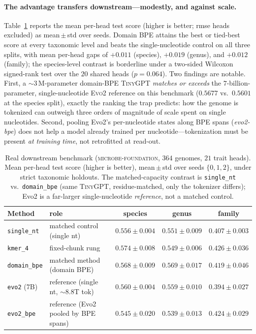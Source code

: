 \paragraph{The advantage transfers downstream---modestly, and against scale.}
Table~\ref{tab:microbe} reports the mean per-head test score (higher is
better; rmse heads excluded) as mean\,$\pm$\,std over seeds. Domain BPE attains
the best or tied-best score at every taxonomic level and beats the
single-nucleotide control on all three splits, with mean per-head gaps of
$+0.011$ (species), $+0.019$ (genus), and $+0.012$ (family); the species-level
contrast is borderline under a two-sided Wilcoxon signed-rank test over the
$20$ shared heads ($p = 0.064$). Two findings are notable. First, a
$\sim\!3$\,M-parameter domain-BPE \textsc{TinyGPT} \emph{matches or exceeds}
the $7$-billion-parameter, single-nucleotide \textsc{Evo2} reference on this
benchmark ($0.5677$ vs.\ $0.5601$ at the species split), exactly the ranking
the trap predicts: how the genome is tokenized can outweigh three orders of
magnitude of scale spent on single nucleotides. Second, pooling Evo2's
per-nucleotide states along BPE spans (\emph{evo2-bpe}) does not help a model
already trained per nucleotide---tokenization must be present \emph{at training
time}, not retrofitted at read-out.

\begin{table}[t]
\centering
\caption{Real downstream benchmark (\textsc{microbe-foundation}, $364$
genomes, $21$ trait heads). Mean per-head test score (higher is better),
mean\,$\pm$\,std over seeds $\{0,1,2\}$, under strict taxonomic holdouts. The
matched-capacity contrast is \texttt{single\_nt} vs.\ \texttt{domain\_bpe}
(same \textsc{TinyGPT}, residue-matched, only the tokenizer differs); Evo2 is a
far-larger single-nucleotide \emph{reference}, not a matched control.}
\label{tab:microbe}
\small
\setlength{\tabcolsep}{5pt}
\begin{tabular}{llccc}
\toprule
Method & role & species & genus & family \\
\midrule
\texttt{single\_nt}     & matched control (single nt) & $0.556\pm0.004$ & $0.551\pm0.009$ & $0.407\pm0.003$ \\
\texttt{kmer\_4}        & fixed-chunk rung            & $\mathbf{0.574}\pm0.008$ & $0.549\pm0.006$ & $0.426\pm0.036$ \\
\texttt{domain\_bpe}    & matched method (domain BPE) & $0.568\pm0.009$ & $\mathbf{0.569}\pm0.017$ & $0.419\pm0.046$ \\
\midrule
\texttt{evo2} (7B)      & reference (single nt, $\sim$8.8T tok) & $0.560\pm0.004$ & $0.559\pm0.010$ & $0.394\pm0.027$ \\
\texttt{evo2\_bpe}      & reference (Evo2 pooled by BPE spans)  & $0.545\pm0.020$ & $0.539\pm0.013$ & $0.424\pm0.029$ \\
\bottomrule
\end{tabular}
\end{table}

